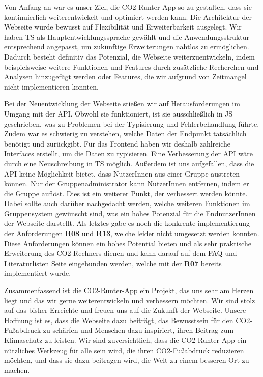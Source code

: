 Von Anfang an war es unser Ziel, die CO2-Runter-App so zu gestalten, dass sie kontinuierlich weiterentwickelt und optimiert werden kann. Die Architektur der Webseite wurde bewusst auf Flexibilität und Erweiterbarkeit ausgelegt. Wir haben \acl{TS} als Hauptentwicklungssprache gewählt und die Anwendungsstruktur entsprechend angepasst, um zukünftige Erweiterungen nahtlos zu ermöglichen. Dadurch besteht definitiv das Potenzial, die Webseite weiterzuentwickeln, indem beispielsweise weitere Funktionen und Features durch zusätzliche Recherchen und Analysen hinzugefügt werden oder Features, die wir aufgrund von Zeitmangel nicht implementieren konnten.

Bei der Neuentwicklung der Webseite stießen wir auf Herausforderungen im Umgang mit der \acs{API}. Obwohl sie funktioniert, ist sie ausschließlich in \acl{JS} geschrieben, was zu Problemen bei der Typisierung und Fehlerbehandlung führte. Zudem war es schwierig zu verstehen, welche Daten der Endpunkt tatsächlich benötigt und zurückgibt. Für das Frontend haben wir deshalb zahlreiche Interfaces erstellt, um die Daten zu typisieren. Eine Verbesserung der \acs{API} wäre durch eine Neuschreibung in \acl{TS} möglich. Außerdem ist uns aufgefallen, dass die \acs{API} keine Möglichkeit bietet, dass NutzerInnen aus einer Gruppe austreten können. Nur der Gruppenadministrator kann NutzerInnen entfernen, indem er die Gruppe auflöst. Dies ist ein weiterer Punkt, der verbessert werden könnte. Dabei sollte auch darüber nachgedacht werden, welche weiteren Funktionen im Gruppensystem gewünscht sind, was ein hohes Potenzial für die EndnutzerInnen der Webseite darstellt. Als letztes gabe es noch die konkrente implementierung der Anforderungen \textbf{R08} und \textbf{R13}, welche leider nicht umgesetzt werden konnten. Diese Anforderungen können ein hohes Potential bieten und als sehr praktische Erweiterung des CO2-Rechners dienen und kann darauf auf dem FAQ und Literaturlisten Seite eingebunden werden, welche mit der \textbf{R07} bereits implementiert wurde.


Zusammenfassend ist die CO2-Runter-App ein Projekt, das uns sehr am Herzen liegt und das wir gerne weiterentwickeln und verbessern möchten. Wir sind stolz auf das bisher Erreichte und freuen uns auf die Zukunft der Webseite. Unsere Hoffnung ist es, dass die Webseite dazu beiträgt, das Bewusstsein für den CO2-Fußabdruck zu schärfen und Menschen dazu inspiriert, ihren Beitrag zum Klimaschutz zu leisten. Wir sind zuversichtlich, dass die CO2-Runter-App ein nützliches Werkzeug für alle sein wird, die ihren CO2-Fußabdruck reduzieren möchten, und dass sie dazu beitragen wird, die Welt zu einem besseren Ort zu machen.
